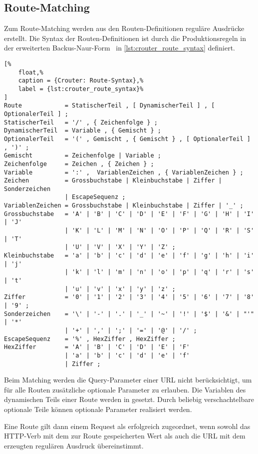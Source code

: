 \subsection{Route-Matching}
\label{ssec:br_route_matching}

Zum Route-Matching werden aus den Routen-Definitionen reguläre Ausdrücke
erstellt.  Die Syntax der Routen-Definitionen ist durch die Produktionsregeln
in der erweiterten Backus-Naur-Form~\cite{ebnf} in
\cref{lst:crouter_route_syntax} definiert.

\begin{lstlisting}[%
	float,%
	caption = {Crouter: Route-Syntax},%
	label = {lst:crouter_route_syntax}%
]
Route            = StatischerTeil , [ DynamischerTeil ] , [ OptionalerTeil ] ;
StatischerTeil   = '/' , { Zeichenfolge } ;
DynamischerTeil  = Variable , { Gemischt } ;
OptionalerTeil   = '(' , Gemischt , { Gemischt } , [ OptionalerTeil ] , ')' ;
Gemischt         = Zeichenfolge | Variable ;
Zeichenfolge     = Zeichen , { Zeichen } ;
Variable         = ':' ,  VariablenZeichen , { VariablenZeichen } ;
Zeichen          = Grossbuchstabe | Kleinbuchstabe | Ziffer | Sonderzeichen
                 | EscapeSequenz ;
VariablenZeichen = Grossbuchstabe | Kleinbuchstabe | Ziffer | '_' ;
Grossbuchstabe   = 'A' | 'B' | 'C' | 'D' | 'E' | 'F' | 'G' | 'H' | 'I' | 'J'
                 | 'K' | 'L' | 'M' | 'N' | 'O' | 'P' | 'Q' | 'R' | 'S' | 'T'
                 | 'U' | 'V' | 'X' | 'Y' | 'Z' ;
Kleinbuchstabe   = 'a' | 'b' | 'c' | 'd' | 'e' | 'f' | 'g' | 'h' | 'i' | 'j'
                 | 'k' | 'l' | 'm' | 'n' | 'o' | 'p' | 'q' | 'r' | 's' | 't'
                 | 'u' | 'v' | 'x' | 'y' | 'z' ;
Ziffer           = '0' | '1' | '2' | '3' | '4' | '5' | '6' | '7' | '8' | '9' ;
Sonderzeichen    = '\' | '-' | '.' | '_' | '~' | '!' | '$' | '&' | "'" | '*'
                 | '+' | ',' | ';' | '=' | '@' | '/' ;
EscapeSequenz    = '%' , HexZiffer , HexZiffer ;
HexZiffer        = 'A' | 'B' | 'C' | 'D' | 'E' | 'F'
                 | 'a' | 'b' | 'c' | 'd' | 'e' | 'f'
                 | Ziffer ;
\end{lstlisting}

Beim Matching werden die Query-Parameter einer URL nicht berücksichtigt, um für
alle Routen zusätzliche optionale Parameter zu erlauben.  Die Variablen des
dynamischen Teils einer Route werden in  gesetzt.  Durch beliebig
verschachtelbare optionale Teile können optionale Parameter realisiert werden.

Eine Route gilt dann einem Request als erfolgreich zugeordnet, wenn sowohl
das HTTP-Verb mit dem zur Route gespeicherten Wert als auch die URL mit dem
erzeugten regulären Ausdruck übereinstimmt.
